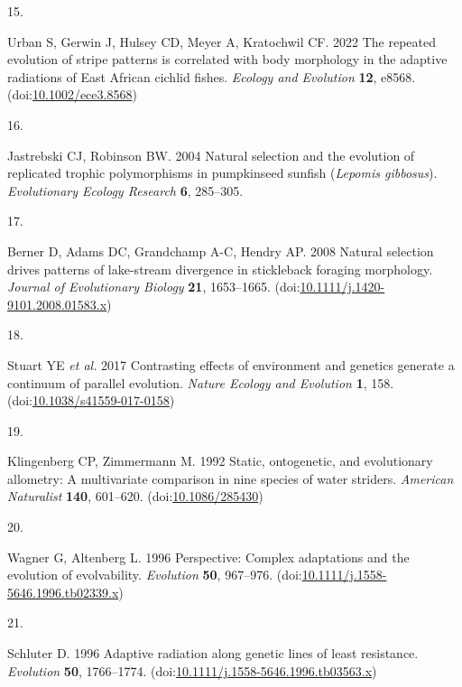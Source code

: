 \documentclass[
  11pt,
]{article}
\newlength{\cslhangindent}
\newlength{\csllabelwidth}
\newlength{\cslentryspacingunit} %
\newenvironment{CSLReferences}[2] %
 {%
  \setlength{\parindent}{0pt}
  \ifodd #1
  \let\oldpar\par
  \def\par{\hangindent=\cslhangindent\oldpar}
  \fi
  \setlength{\parskip}{#2\cslentryspacingunit}
 }%
 {}
\newcommand{\CSLLeftMargin}[1]{\parbox[t]{\csllabelwidth}{#1}}
\newcommand{\CSLRightInline}[1]{\parbox[t]{\linewidth - \csllabelwidth}{#1}\break}
\begin{document}
\begin{CSLReferences}{0}{0}
\leavevmode{}%
\CSLLeftMargin{15. }%
\CSLRightInline{Urban S, Gerwin J, Hulsey CD, Meyer A, Kratochwil CF.
2022 The repeated evolution of stripe patterns is correlated with body
morphology in the adaptive radiations of {E}ast {A}frican cichlid
fishes. \emph{Ecology and Evolution} \textbf{12}, e8568.
(doi:\href{https://doi.org/10.1002/ece3.8568}{10.1002/ece3.8568})}

\leavevmode{}%
\CSLLeftMargin{16. }%
\CSLRightInline{Jastrebski CJ, Robinson BW. 2004 Natural selection and
the evolution of replicated trophic polymorphisms in pumpkinseed sunfish
(\emph{{L}epomis gibbosus}). \emph{Evolutionary Ecology Research}
\textbf{6}, 285--305.}

\leavevmode{}%
\CSLLeftMargin{17. }%
\CSLRightInline{Berner D, Adams DC, Grandchamp A-C, Hendry AP. 2008
Natural selection drives patterns of lake-stream divergence in
stickleback foraging morphology. \emph{Journal of Evolutionary Biology}
\textbf{21}, 1653--1665.
(doi:\href{https://doi.org/10.1111/j.1420-9101.2008.01583.x}{10.1111/j.1420-9101.2008.01583.x})}

\leavevmode{}%
\CSLLeftMargin{18. }%
\CSLRightInline{Stuart YE \emph{et al.} 2017 Contrasting effects of
environment and genetics generate a continuum of parallel evolution.
\emph{Nature Ecology and Evolution} \textbf{1}, 158.
(doi:\href{https://doi.org/10.1038/s41559-017-0158}{10.1038/s41559-017-0158})}

\leavevmode{}%
\CSLLeftMargin{19. }%
\CSLRightInline{Klingenberg CP, Zimmermann M. 1992 Static, ontogenetic,
and evolutionary allometry: A multivariate comparison in nine species of
water striders. \emph{American Naturalist} \textbf{140}, 601--620.
(doi:\href{https://doi.org/10.1086/285430}{10.1086/285430})}

\leavevmode{}%
\CSLLeftMargin{20. }%
\CSLRightInline{Wagner G, Altenberg L. 1996 Perspective: Complex
adaptations and the evolution of evolvability. \emph{Evolution}
\textbf{50}, 967--976.
(doi:\href{https://doi.org/10.1111/j.1558-5646.1996.tb02339.x}{10.1111/j.1558-5646.1996.tb02339.x})}

\leavevmode{}%
\CSLLeftMargin{21. }%
\CSLRightInline{Schluter D. 1996 Adaptive radiation along genetic lines
of least resistance. \emph{Evolution} \textbf{50}, 1766--1774.
(doi:\href{https://doi.org/10.1111/j.1558-5646.1996.tb03563.x}{10.1111/j.1558-5646.1996.tb03563.x})}


\end{CSLReferences}
\end{document}
